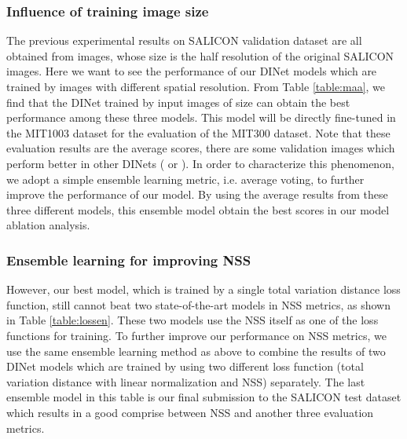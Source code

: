 \subsubsection{Influence of training image size} 
The previous experimental results on SALICON validation dataset are all obtained from  images, whose size is the half resolution of the original SALICON images. Here we want to see the performance of our DINet models which are trained by images with different spatial resolution. From Table \ref{table:maa}, we find that the DINet trained by input images of size  can obtain the best performance among these three models. This model will be directly fine-tuned in the MIT1003 dataset for the evaluation of the MIT300 dataset. Note that these evaluation results are the average scores, there are some validation images which perform better in other DINets ( or ). In order to characterize this phenomenon, we adopt a simple ensemble learning metric, i.e. average voting, to further improve the performance of our model. By using the average results from these three different models, this ensemble model obtain the best scores in our model ablation analysis.

\subsubsection{Ensemble learning for improving NSS} 
However, our best model, which is trained by a single total variation distance loss function, still cannot beat two state-of-the-art models \cite{cornia2016predicting,liu2016deep} in NSS metrics, as shown in Table \ref{table:lossen}. These two models use the NSS itself as one of the loss functions for training. To further improve our performance on NSS metrics, we use the same ensemble learning method as above to combine the results of two DINet models which are trained by using two different loss function (total variation distance with linear normalization and NSS) separately. The last ensemble model in this table is our final submission to the SALICON test dataset which results in a good comprise between NSS and another three evaluation metrics.





